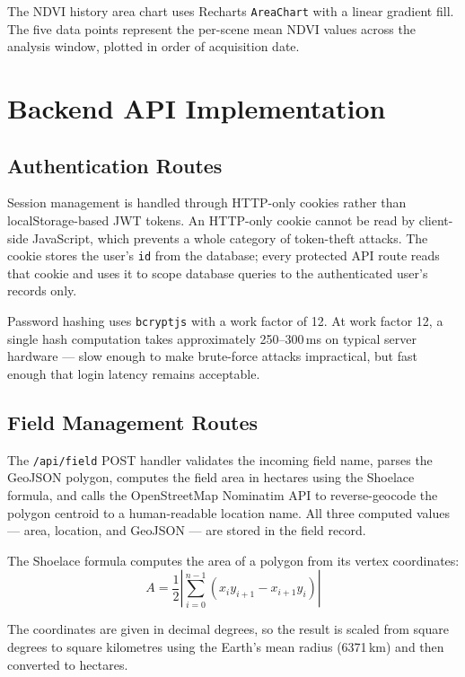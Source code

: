 The NDVI history area chart uses Recharts \texttt{AreaChart} with a linear gradient fill. The five data points represent the per-scene mean NDVI values across the analysis window, plotted in order of acquisition date.

\section{Backend API Implementation}

\subsection{Authentication Routes}

Session management is handled through HTTP-only cookies rather than localStorage-based JWT tokens. An HTTP-only cookie cannot be read by client-side JavaScript, which prevents a whole category of token-theft attacks. The cookie stores the user's \texttt{id} from the database; every protected API route reads that cookie and uses it to scope database queries to the authenticated user's records only.

Password hashing uses \texttt{bcryptjs} with a work factor of 12. At work factor 12, a single hash computation takes approximately 250--300\,ms on typical server hardware — slow enough to make brute-force attacks impractical, but fast enough that login latency remains acceptable.

\subsection{Field Management Routes}

The \texttt{/api/field} POST handler validates the incoming field name, parses the GeoJSON polygon, computes the field area in hectares using the Shoelace formula, and calls the OpenStreetMap Nominatim API to reverse-geocode the polygon centroid to a human-readable location name. All three computed values — area, location, and GeoJSON — are stored in the field record.

The Shoelace formula computes the area of a polygon from its vertex coordinates:
\begin{equation}
  A = \frac{1}{2} \left| \sum_{i=0}^{n-1} (x_i y_{i+1} - x_{i+1} y_i) \right|
  \label{eq:shoelace}
\end{equation}

\noindent The coordinates are given in decimal degrees, so the result is scaled from square degrees to square kilometres using the Earth's mean radius (6371\,km) and then converted to hectares.

